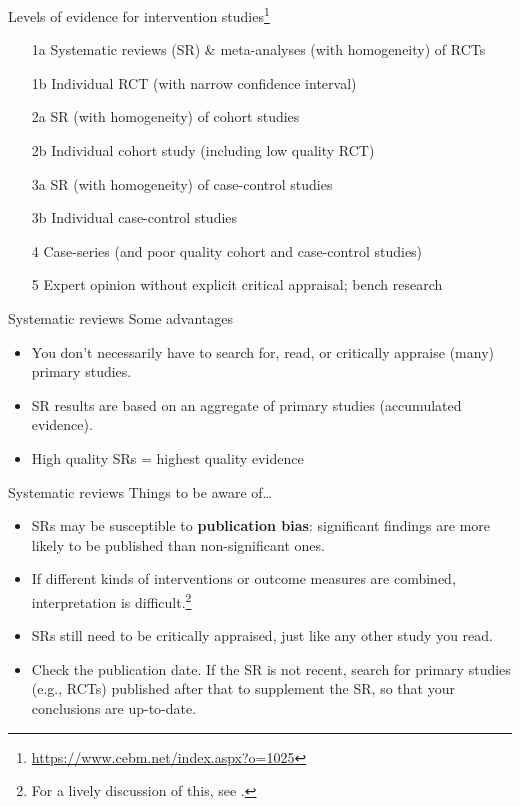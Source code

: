 \documentclass{beamer}
\begin{document}
% 
\begin{frame}{Levels of evidence for intervention studies\footnote{\tiny{\url{https://www.cebm.net/index.aspx?o=1025}}}}
	\begin{itemize}
	\item[1a] \alert{Systematic reviews (SR) \& meta-analyses (with homogeneity) of RCTs}
	\item[1b] Individual RCT (with narrow confidence interval)  
	\item[2a] SR (with homogeneity) of cohort studies
	\item[2b] Individual cohort study (including low quality RCT)
	\item[3a] SR (with homogeneity) of case-control studies
	\item[3b] Individual case-control studies
	\item[4] Case-series (and poor quality cohort and case-control studies)
	\item[5] Expert opinion without explicit critical appraisal; bench research
	\end{itemize}
\end{frame}

% 
\begin{frame}{Systematic reviews}
Some advantages
	\begin{itemize}
	\item You don't necessarily have to search for, read, or critically appraise (many) primary studies.
	\item SR results are based on an aggregate of primary studies (accumulated evidence).
	\item High quality SRs = highest quality evidence
	\end{itemize}
\end{frame}

% 
\begin{frame}{Systematic reviews}
Things to be aware of\ldots 
	\begin{itemize}
	\item SRs may be susceptible to \textbf{publication bias}: significant findings are more likely to be published than non-significant ones.
	\item If different kinds of interventions or outcome measures are combined, interpretation is difficult.\footnote{\tiny{For a lively discussion of this, see {\citet{Johnston2005}.}}} 
	\item SRs still need to be critically appraised, just like any other study you read.
	\item Check the publication date. If the SR is not recent, search for primary studies (e.g., RCTs) published after that to supplement the SR, so that your conclusions are up-to-date.
	\end{itemize}
\end{frame}
\end{document}
